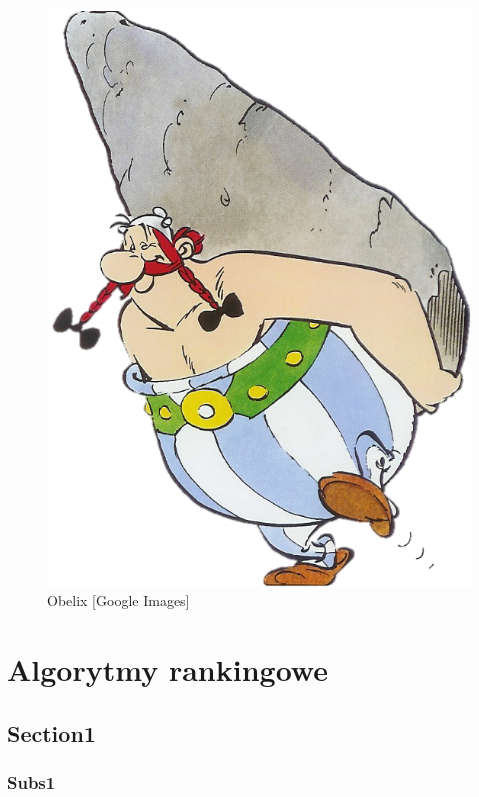 \documentclass[a4paper,12pt,oneside]{book} %
\begin{document}
\begin{figure}[h]
\centering
\includegraphics[scale=0.8]{obelix.png}
\caption{Obelix [Google Images]}
\end{figure}

\lipsum[1]\cite{test5}


\chapter{Algorytmy rankingowe}

\section{Section1}

\lipsum[1]

\subsection{Subs1}
\lipsum[1]
\end{document}
